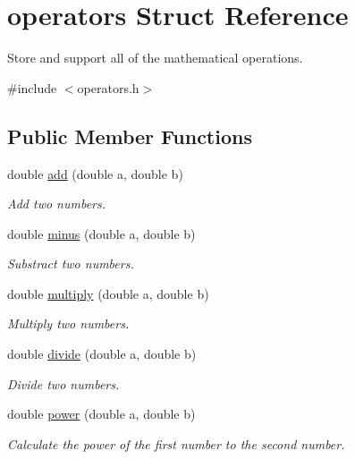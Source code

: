 \hypertarget{structoperators}{\section{operators Struct Reference}
\label{structoperators}
}


Store and support all of the mathematical operations.  




{\ttfamily \#include $<$operators.\-h$>$}

\subsection*{Public Member Functions}
\begin{DoxyCompactItemize}
\item 
double \hyperlink{structoperators_ae0d6d40c5f0dbdd444b0d6e51b224b6f}{add} (double a, double b)
\begin{DoxyCompactList}\small\item\em Add two numbers. \end{DoxyCompactList}\item 
double \hyperlink{structoperators_ada39d64c0a621fe571f02b95d418c776}{minus} (double a, double b)
\begin{DoxyCompactList}\small\item\em Substract two numbers. \end{DoxyCompactList}\item 
double \hyperlink{structoperators_ac949e69d65ab7d1987f3dd728e6d259a}{multiply} (double a, double b)
\begin{DoxyCompactList}\small\item\em Multiply two numbers. \end{DoxyCompactList}\item 
double \hyperlink{structoperators_a8735ddf3ac69922839b5a2151bc7bb53}{divide} (double a, double b)
\begin{DoxyCompactList}\small\item\em Divide two numbers. \end{DoxyCompactList}\item 
double \hyperlink{structoperators_aa9a057291e79666d3537e65bab80b8c6}{power} (double a, double b)
\begin{DoxyCompactList}\small\item\em Calculate the power of the first number to the second number. \end{DoxyCompactList}\item 

\end{DoxyCompactItemize}

